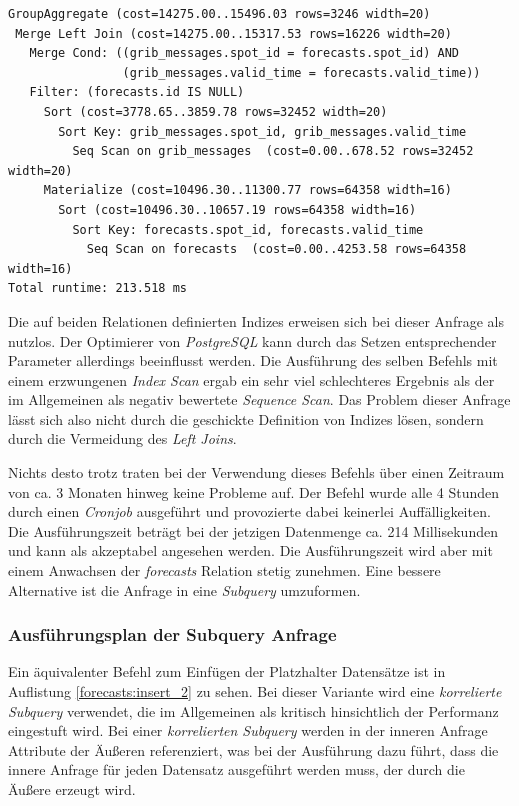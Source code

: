 \begin{lstlisting}[captionpos=b, caption=Ausführungsplan des Left Joins, label=forecasts:explain_1]
GroupAggregate (cost=14275.00..15496.03 rows=3246 width=20)
 Merge Left Join (cost=14275.00..15317.53 rows=16226 width=20)
   Merge Cond: ((grib_messages.spot_id = forecasts.spot_id) AND 
                (grib_messages.valid_time = forecasts.valid_time))
   Filter: (forecasts.id IS NULL)
     Sort (cost=3778.65..3859.78 rows=32452 width=20)
       Sort Key: grib_messages.spot_id, grib_messages.valid_time
         Seq Scan on grib_messages  (cost=0.00..678.52 rows=32452 width=20)
     Materialize (cost=10496.30..11300.77 rows=64358 width=16)
       Sort (cost=10496.30..10657.19 rows=64358 width=16)
         Sort Key: forecasts.spot_id, forecasts.valid_time
           Seq Scan on forecasts  (cost=0.00..4253.58 rows=64358 width=16)
Total runtime: 213.518 ms
\end{lstlisting}

Die auf beiden Relationen definierten Indizes erweisen sich bei dieser
Anfrage als nutzlos. Der Optimierer von \textit{PostgreSQL} kann durch
das Setzen entsprechender Parameter allerdings beeinflusst werden. Die
Ausführung des selben Befehls mit einem erzwungenen \textit{Index
  Scan} ergab ein sehr viel schlechteres Ergebnis als der im
Allgemeinen als negativ bewertete \textit{Sequence Scan}. Das Problem
dieser Anfrage lässt sich also nicht durch die geschickte Definition
von Indizes lösen, sondern durch die Vermeidung des \textit{Left
  Joins}.

Nichts desto trotz traten bei der Verwendung dieses Befehls über einen
Zeitraum von ca. 3 Monaten hinweg keine Probleme auf. Der Befehl wurde
alle 4 Stunden durch einen \textit{Cronjob} ausgeführt und provozierte
dabei keinerlei Auffälligkeiten. Die Ausführungszeit beträgt bei der
jetzigen Datenmenge ca. 214 Millisekunden und kann als akzeptabel
angesehen werden. Die Ausführungszeit wird aber mit einem Anwachsen
der \textit{forecasts} Relation stetig zunehmen. Eine bessere
Alternative ist die Anfrage in eine \textit{Subquery} umzuformen.

\subsubsection{Ausführungsplan der Subquery Anfrage}
Ein äquivalenter Befehl zum Einfügen der Platzhalter Datensätze ist in
Auflistung \ref{forecasts:insert_2} zu sehen. Bei dieser Variante wird
eine \textit{korrelierte Subquery} verwendet, die im Allgemeinen als
kritisch hinsichtlich der Performanz eingestuft wird. Bei einer
\textit{korrelierten Subquery} werden in der inneren Anfrage Attribute
der Äußeren referenziert, was bei der Ausführung dazu führt, dass die
innere Anfrage für jeden Datensatz ausgeführt werden muss, der durch
die Äußere erzeugt wird.

